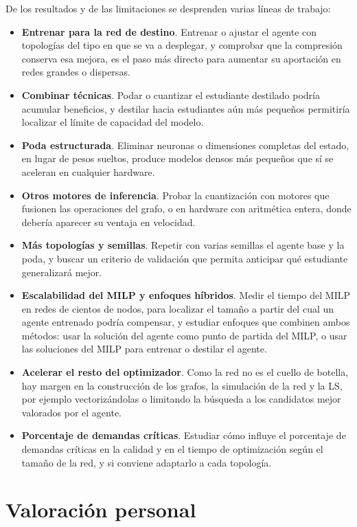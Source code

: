 De los resultados y de las limitaciones se desprenden varias líneas de trabajo:

\begin{itemize}
	\item \textbf{Entrenar para la red de destino}. Entrenar o ajustar el agente con topologías del tipo en que se va a desplegar, y comprobar que la compresión conserva esa mejora, es el paso más directo para aumentar su aportación en redes grandes o dispersas.
	\item \textbf{Combinar técnicas}. Podar o cuantizar el estudiante destilado podría acumular beneficios, y destilar hacia estudiantes aún más pequeños permitiría localizar el límite de capacidad del modelo.
	\item \textbf{Poda estructurada}. Eliminar neuronas o dimensiones completas del estado, en lugar de pesos sueltos, produce modelos densos más pequeños que sí se aceleran en cualquier hardware.
	\item \textbf{Otros motores de inferencia}. Probar la cuantización con motores que fusionen las operaciones del grafo, o en hardware con aritmética entera, donde debería aparecer su ventaja en velocidad.
	\item \textbf{Más topologías y semillas}. Repetir con varias semillas el agente base y la poda, y buscar un criterio de validación que permita anticipar qué estudiante generalizará mejor.
	\item \textbf{Escalabilidad del MILP y enfoques híbridos}. Medir el tiempo del MILP en redes de cientos de nodos, para localizar el tamaño a partir del cual un agente entrenado podría compensar, y estudiar enfoques que combinen ambos métodos: usar la solución del agente como punto de partida del MILP, o usar las soluciones del MILP para entrenar o destilar el agente.
	\item \textbf{Acelerar el resto del optimizador}. Como la red no es el cuello de botella, hay margen en la construcción de los grafos, la simulación de la red y la LS, por ejemplo vectorizándolas o limitando la búsqueda a los candidatos mejor valorados por el agente.
	\item \textbf{Porcentaje de demandas críticas}. Estudiar cómo influye el porcentaje de demandas críticas en la calidad y en el tiempo de optimización según el tamaño de la red, y si conviene adaptarlo a cada topología.
\end{itemize}

\section{Valoración personal}\label{sec:con_valoracion}

